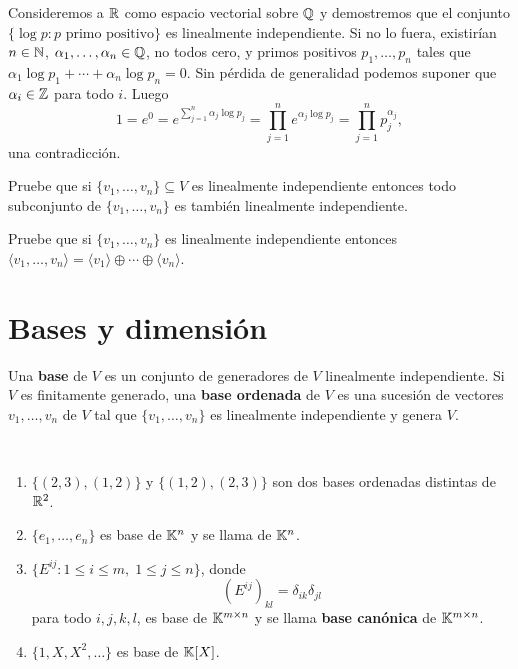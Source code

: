 \begin{example}
    Consideremos a $\mathbb{R}$ como espacio vectorial sobre $\mathbb{Q}$ y demostremos que el
    conjunto $\{\log p:p\text{ primo positivo}\}$ es linealmente independiente.
    Si no lo fuera, existirían $n\in\mathbb{N}$, $\alpha_1,\dots,\alpha_n\in\mathbb{Q}$, no
    todos cero, y primos positivos $p_{1},\dots,p_{n}$ tales que $\alpha_1\log
    p_{1}+\cdots+\alpha_n\log p_{n}=0$. Sin pérdida de generalidad podemos
    suponer que $\alpha_i\in\mathbb{Z}$ para todo $i$. Luego
    \[
    1=e^0=e^{\sum_{j=1}^n \alpha_j\log p_{j}}=\prod_{j=1}^ne^{\alpha_j\log p_{j}}=\prod_{j=1}^n p_j^{\alpha_j}, 
    \]
    una contradicción. 
\end{example}


\begin{xca}
    Pruebe que si $\{v_1,\dots,v_n\}\subseteq V$ es linealmente independiente
    entonces todo subconjunto de $\{v_1,\dots,v_n\}$ es también linealmente
    independiente.
\end{xca}

\begin{xca}
	Pruebe que si $\{v_1,\dots,v_n\}$ es linealmente independiente entonces 
	$\langle v_1,\dots,v_n\rangle=\langle v_1\rangle\oplus\cdots\oplus\langle
	v_n\rangle$.
\end{xca}

\section{Bases y dimensión}

\begin{block}
    Una \textbf{base} de $V$ es un conjunto de generadores de $V$ linealmente
    independiente.  Si $V$ es finitamente generado, una \textbf{base ordenada}
    de $V$ es una sucesión de vectores $v_1,\dots,v_n$ de $V$ tal que
    $\{v_1,\dots,v_n\}$ es linealmente independiente y genera $V$.
\end{block}

\begin{examples}\
	\begin{enumerate}
        \item $\{(2,3),(1,2)\}$ y $\{(1,2),(2,3)\}$ son dos bases ordenadas
            distintas de $\mathbb{R}^2$. 
        \item $\{e_1,\dots,e_n\}$ es base de $\mathbb{K}^n$ y se llama \text{base
            canónica} de $\mathbb{K}^n$.  
		\item $\{E^{ij}:1\leq i\leq m,\;1\leq j\leq n\}$, donde 
			\[
				(E^{ij})_{kl}=\delta_{ik}\delta_{jl}
			\]
			para todo $i,j,k,l$, es base de $\mathbb{K}^{m\times n}$ y se llama
			\textbf{base canónica} de $\mathbb{K}^{m\times n}$.  
		\item $\{1,X,X^2,\dots\}$ es base de $\mathbb{K}[X]$.
	\end{enumerate}
\end{examples}


